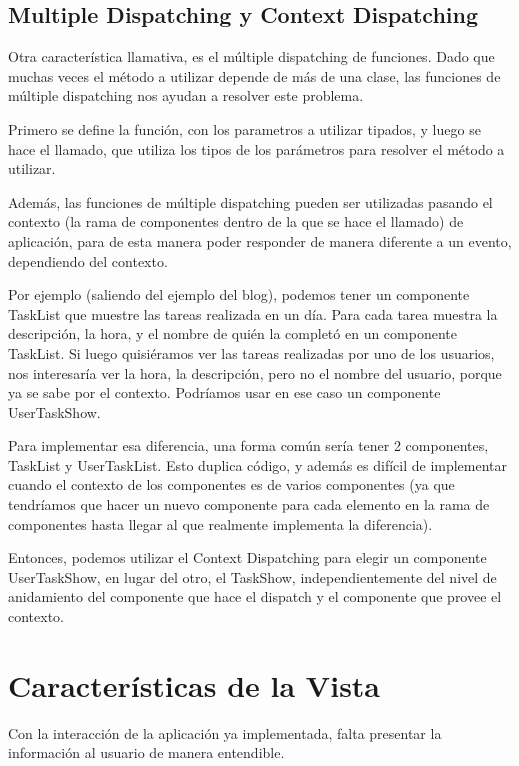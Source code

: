 \subsection{Multiple Dispatching y Context Dispatching}
\label{sub-dispatch}

Otra característica llamativa, es el múltiple dispatching de funciones.
Dado que muchas veces el método a utilizar depende de más de una clase, las funciones de múltiple dispatching nos ayudan a resolver este problema.

Primero se define la función, con los parametros a utilizar tipados, y luego se hace el llamado, que utiliza los tipos de los parámetros para resolver el método a utilizar.

Además, las funciones de múltiple dispatching pueden ser utilizadas pasando el contexto (la rama de componentes dentro de la que se hace el llamado) de aplicación, para de esta manera poder responder de manera diferente a un evento, dependiendo del contexto.


Por ejemplo (saliendo del ejemplo del blog), podemos tener un componente TaskList que muestre las tareas realizada en un día. Para cada tarea muestra la descripción, la hora, y el nombre de quién la completó en un componente TaskList. Si luego quisiéramos ver las tareas realizadas por uno de los usuarios, nos interesaría ver la hora, la descripción, pero no el nombre del usuario, porque ya se sabe por el contexto. Podríamos usar en ese caso un componente UserTaskShow.

Para implementar esa diferencia, una forma común sería tener 2 componentes, TaskList y UserTaskList. Esto duplica código, y además es difícil de implementar cuando el contexto de los componentes es de varios componentes (ya que tendríamos que hacer un nuevo componente para cada elemento en la rama de componentes hasta llegar al que realmente implementa la diferencia).

Entonces, podemos utilizar el Context Dispatching para elegir un componente UserTaskShow, en lugar del otro, el TaskShow, independientemente del nivel de anidamiento del componente que hace el dispatch y el componente que provee el contexto.

\section{Características de la Vista}

Con la interacción de la aplicación ya implementada, falta presentar la información al usuario de manera entendible.


